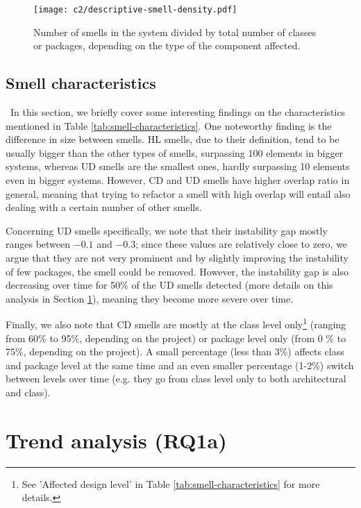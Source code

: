 \begin{figure*}
    \centering
    \texttt{[image: c2/descriptive-smell-density.pdf]}
    \caption{Number of smells in the system divided by total number of classes or packages, depending on the type of the component affected.}\label{c2:fig:smell-count}
\end{figure*}

\subsection{Smell characteristics}\
In this section, we briefly cover some interesting findings on the characteristics mentioned in Table \ref{tab:smell-characteristics}.
One noteworthy finding is the difference in size between smells. HL smells, due to their definition, tend to be usually bigger than the other types of smells, surpassing 100 elements in bigger systems, whereas UD smells are the smallest ones, hardly surpassing 10 elements even in bigger systems.
However, CD and UD smells have higher overlap ratio in general, meaning that trying to refactor a smell with high overlap will entail also dealing with a certain number of other smells.

Concerning UD smells specifically, we note that their instability gap mostly ranges between $-0.1$ and $-0.3$; since these values are relatively close to zero, we argue that they are not very prominent and by slightly improving the instability of few packages, the smell could be removed.
However, the instability gap is also decreasing over time for 50\% of the UD smells detected (more details on this analysis in Section \ref{c2:sec:rq1a-results}), meaning they become more severe over time. 

Finally, we also note that CD smells are mostly at the class level only\footnote{See 'Affected design level' in Table \ref{tab:smell-characteristics} for more details.} (ranging from 60\% to 95\%, depending on the project) or package level only (from 0 \% to 75\%, depending on the project).
A small percentage (less than 3\%) affects class and package level at the same time and an even smaller percentage (1-2\%) switch between levels over time (e.g. they go from class level only to both architectural and class).

\section{Trend analysis (RQ1a)}\label{c2:sec:rq1a-results}
